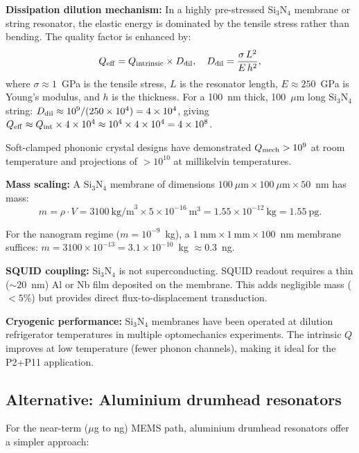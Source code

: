 \documentclass[11pt]{article}
\theoremstyle{definition}
\theoremstyle{remark}
\newcommand{\ee}[1]{\times 10^{#1}}
\begin{document}
\textbf{Dissipation dilution mechanism:} In a highly pre-stressed
Si$_3$N$_4$ membrane or string resonator, the elastic energy is dominated
by the tensile stress rather than bending. The quality factor is enhanced
by:
\begin{equation}
  Q_{\rm eff} = Q_{\rm intrinsic} \times D_{\rm dil},
  \quad D_{\rm dil} = \frac{\sigma\,L^2}{E\,h^2},
\end{equation}
where $\sigma \approx 1$~GPa is the tensile stress, $L$ is the resonator
length, $E \approx 250$~GPa is Young's modulus, and $h$ is the thickness.
For a 100~nm thick, 100~$\mu$m long Si$_3$N$_4$ string:
$D_{\rm dil} \approx 10^9/(250\times10^4) = 4\ee{4}$, giving
$Q_{\rm eff} \approx Q_{\rm int} \times 4\ee{4} \approx 10^4 \times 4\ee{4}
= 4\ee{8}$.

Soft-clamped phononic crystal designs have demonstrated
$Q_{\rm mech} > 10^9$ at room temperature and projections of $>10^{10}$
at millikelvin temperatures.

\textbf{Mass scaling:} A Si$_3$N$_4$ membrane of dimensions
$100~\mu\text{m} \times 100~\mu\text{m} \times 50$~nm has mass:
\begin{equation}
  m = \rho \cdot V = 3100~\text{kg/m}^3 \times 5\ee{-16}~\text{m}^3
  = 1.55\ee{-12}~\text{kg} = 1.55~\text{pg}.
\end{equation}

For the nanogram regime ($m = 10^{-9}$~kg), a
$1~\text{mm} \times 1~\text{mm} \times 100$~nm membrane suffices:
$m = 3100 \times 10^{-13} = 3.1\ee{-10}$~kg $\approx 0.3$~ng.

\textbf{SQUID coupling:} Si$_3$N$_4$ is not superconducting. SQUID
readout requires a thin ($\sim 20$~nm) Al or Nb film deposited on the
membrane. This adds negligible mass ($< 5\%$) but provides direct
flux-to-displacement transduction.

\textbf{Cryogenic performance:} Si$_3$N$_4$ membranes have been operated
at dilution refrigerator temperatures in multiple optomechanics
experiments. The intrinsic $Q$ improves at low temperature (fewer phonon
channels), making it ideal for the P2+P11 application.

\subsection{Alternative: Aluminium drumhead resonators}

For the near-term ($\mu$g to ng) MEMS path, aluminium drumhead resonators
offer a simpler approach:
\end{document}

